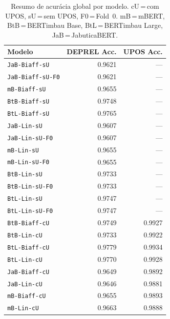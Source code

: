 \begin{table}[ht]
\centering\footnotesize
\caption{Resumo de acurácia global por modelo. cU\,=\,com UPOS, sU\,=\,sem UPOS, F0\,=\,Fold~0. mB\,=\,mBERT, BtB\,=\,BERTimbau Base, BtL\,=\,BERTimbau Large, JaB\,=\,JabuticaBERT.}
\label{tab:resumo-acuracia-geral}
\begin{tabular}{lrr}
\toprule
\textbf{Modelo} & \textbf{DEPREL Acc.} & \textbf{UPOS Acc.} \\
\midrule
\texttt{JaB-Biaff-sU} & 0.9621 & --- \\
\texttt{JaB-Biaff-sU-F0} & 0.9621 & --- \\
\texttt{mB-Biaff-sU} & 0.9655 & --- \\
\texttt{BtB-Biaff-sU} & 0.9748 & --- \\
\texttt{BtL-Biaff-sU} & 0.9765 & --- \\
\texttt{JaB-Lin-sU} & 0.9607 & --- \\
\texttt{JaB-Lin-sU-F0} & 0.9607 & --- \\
\texttt{mB-Lin-sU} & 0.9655 & --- \\
\texttt{mB-Lin-sU-F0} & 0.9655 & --- \\
\texttt{BtB-Lin-sU} & 0.9733 & --- \\
\texttt{BtB-Lin-sU-F0} & 0.9733 & --- \\
\texttt{BtL-Lin-sU} & 0.9747 & --- \\
\texttt{BtL-Lin-sU-F0} & 0.9747 & --- \\
\texttt{BtB-Biaff-cU} & 0.9749 & 0.9927 \\
\texttt{BtB-Lin-cU} & 0.9733 & 0.9922 \\
\texttt{BtL-Biaff-cU} & 0.9779 & 0.9934 \\
\texttt{BtL-Lin-cU} & 0.9770 & 0.9928 \\
\texttt{JaB-Biaff-cU} & 0.9649 & 0.9892 \\
\texttt{JaB-Lin-cU} & 0.9646 & 0.9881 \\
\texttt{mB-Biaff-cU} & 0.9655 & 0.9893 \\
\texttt{mB-Lin-cU} & 0.9663 & 0.9888 \\
\bottomrule
\end{tabular}
\end{table}
